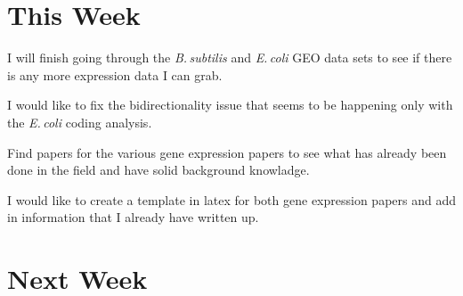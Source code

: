 \documentclass[12pt]{article}
\newcommand{\smel}{\textit{S.\,meliloti}\xspace}
\newcommand{\bass}{\textit{B.\,subtilis}\xspace}
\newcommand{\ecol}{\textit{E.\,coli}\xspace}
\newcommand{\ecoli}{\textit{Escherichia coli}\xspace}
\begin{document}


\section*{This Week}
I will finish going through the \bass and \ecol GEO data sets to see if there is any more expression data I can grab.

I would like to fix the bidirectionality issue that seems to be happening only with the \ecol coding analysis.

Find papers for the various gene expression papers to see what has already been done in the field and have solid background knowladge.

I would like to create a template in latex for both gene expression papers and add in information that I already have written up.



\section*{Next Week}
\end{document}
